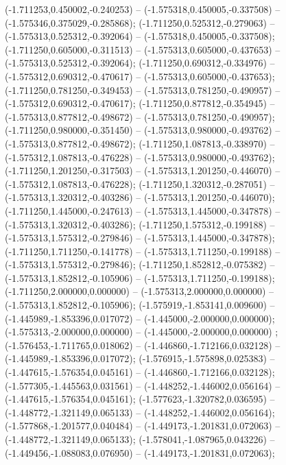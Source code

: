  (-1.711253,0.450002,-0.240253) -- (-1.575318,0.450005,-0.337508) -- (-1.575346,0.375029,-0.285868);
 (-1.711250,0.525312,-0.279063) -- (-1.575313,0.525312,-0.392064) -- (-1.575318,0.450005,-0.337508);
 (-1.711250,0.605000,-0.311513) -- (-1.575313,0.605000,-0.437653) -- (-1.575313,0.525312,-0.392064);
 (-1.711250,0.690312,-0.334976) -- (-1.575312,0.690312,-0.470617) -- (-1.575313,0.605000,-0.437653);
 (-1.711250,0.781250,-0.349453) -- (-1.575313,0.781250,-0.490957) -- (-1.575312,0.690312,-0.470617);
 (-1.711250,0.877812,-0.354945) -- (-1.575313,0.877812,-0.498672) -- (-1.575313,0.781250,-0.490957);
 (-1.711250,0.980000,-0.351450) -- (-1.575313,0.980000,-0.493762) -- (-1.575313,0.877812,-0.498672);
 (-1.711250,1.087813,-0.338970) -- (-1.575312,1.087813,-0.476228) -- (-1.575313,0.980000,-0.493762);
 (-1.711250,1.201250,-0.317503) -- (-1.575313,1.201250,-0.446070) -- (-1.575312,1.087813,-0.476228);
 (-1.711250,1.320312,-0.287051) -- (-1.575313,1.320312,-0.403286) -- (-1.575313,1.201250,-0.446070);
 (-1.711250,1.445000,-0.247613) -- (-1.575313,1.445000,-0.347878) -- (-1.575313,1.320312,-0.403286);
 (-1.711250,1.575312,-0.199188) -- (-1.575313,1.575312,-0.279846) -- (-1.575313,1.445000,-0.347878);
 (-1.711250,1.711250,-0.141778) -- (-1.575313,1.711250,-0.199188) -- (-1.575313,1.575312,-0.279846);
 (-1.711250,1.852812,-0.075382) -- (-1.575313,1.852812,-0.105906) -- (-1.575313,1.711250,-0.199188);
 (-1.711250,2.000000,0.000000) -- (-1.575313,2.000000,0.000000) -- (-1.575313,1.852812,-0.105906);
 (-1.575919,-1.853141,0.009600) -- (-1.445989,-1.853396,0.017072) -- (-1.445000,-2.000000,0.000000);
 (-1.575313,-2.000000,0.000000) -- (-1.445000,-2.000000,0.000000) ;
 (-1.576453,-1.711765,0.018062) -- (-1.446860,-1.712166,0.032128) -- (-1.445989,-1.853396,0.017072);
 (-1.576915,-1.575898,0.025383) -- (-1.447615,-1.576354,0.045161) -- (-1.446860,-1.712166,0.032128);
 (-1.577305,-1.445563,0.031561) -- (-1.448252,-1.446002,0.056164) -- (-1.447615,-1.576354,0.045161);
 (-1.577623,-1.320782,0.036595) -- (-1.448772,-1.321149,0.065133) -- (-1.448252,-1.446002,0.056164);
 (-1.577868,-1.201577,0.040484) -- (-1.449173,-1.201831,0.072063) -- (-1.448772,-1.321149,0.065133);
 (-1.578041,-1.087965,0.043226) -- (-1.449456,-1.088083,0.076950) -- (-1.449173,-1.201831,0.072063);
